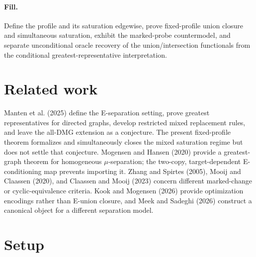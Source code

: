 \documentclass{article}
\begin{document}
\paragraph{Fill.} Define the profile and its saturation edgewise, prove fixed-profile union closure and simultaneous saturation, exhibit the marked-probe countermodel, and separate unconditional oracle recovery of the union/intersection functionals from the conditional greatest-representative interpretation.

\section{Related work}

Manten et al. (2025) define the E-separation setting, prove greatest representatives for directed graphs, develop restricted mixed replacement rules, and leave the all-DMG extension as a conjecture. The present fixed-profile theorem formalizes and simultaneously closes the mixed saturation regime but does not settle that conjecture. Mogensen and Hansen (2020) provide a greatest-graph theorem for homogeneous \(\mu\)-separation; the two-copy, target-dependent E-conditioning map prevents importing it. Zhang and Spirtes (2005), Mooij and Claassen (2020), and Claassen and Mooij (2023) concern different marked-change or cyclic-equivalence criteria. Kook and Mogensen (2026) provide optimization encodings rather than E-union closure, and Meek and Sadeghi (2026) construct a canonical object for a different separation model.

\section{Setup}
\end{document}
